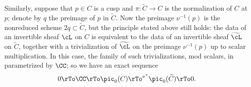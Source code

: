 \def\wL{{\widetilde\sL}}

Similarly, suppose that $p\in C$ is a cusp and $\pi: \widetilde C \to C$ is the normalization of $C$ at $p$; denote by $q$ the preimage of $p$ in $\widetilde C$. Now the preimage $\nu^{-1}(p)$ is the nonreduced scheme $2q \subset \widetilde C$, but the principle stated above still holds: the data of an invertible sheaf $\cL$ on $C$ is equivalent to the data of an invertible sheaf $\widetilde \cL$ on $\widetilde C$, together with a trivialization of $\widetilde \cL$ on the preimage $\nu^{-1}(p)$ up to scalar multiplication. In this case, the family of such trivializations, mod scalars, in parametrized by $\CC$; so we have an exact sequence 
$$
0 \rTo \CC \rTo \pic_0(C) \rTo^{\nu^*} \pic_0(\widetilde C) \rTo 0.
$$


%
%

 


